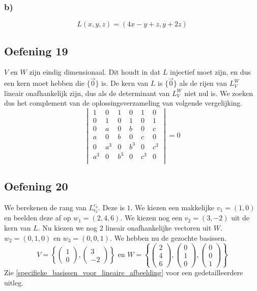 \documentclass[lineaire_algebra_oplossingen.tex]{subfiles}
\begin{document}
\subsubsection*{b)}
\[
L(x,y,z) = (4x-y+z,y+2z)
\]

\subsection{Oefening 19}
$V$ en $W$ zijn eindig dimensionaal. Dit houdt in dat $L$ injectief moet zijn, en dus een kern moet hebben die $\{\vec{0}\}$ is. De kern van $L$ is $\{\vec{0}\}$ als de rijen van $L_V^W$ lineair onafhankelijk zijn, dus als de determinant van $L_V^W$ niet nul is. We zoeken dus het complement van de oplossingsverzameling van volgende vergelijking.
\[
\begin{vmatrix}
1 & 0 & 1 & 0 & 1 & 0\\
0 & 1 & 0 & 1 & 0 & 1\\
0 & a & 0 & b & 0 & c\\
a & 0 & b & 0 & c & 0\\
0 & a^3 & 0 & b^3 & 0 & c^3\\
a^3 & 0 & b^3 & 0 & c^3 & 0\\
\end{vmatrix}
= 0
\]

\subsection{Oefening 20}
We berekenen de rang van $L_{\epsilon_2}^{\epsilon_3}$. Deze is $1$.
We kiezen een makkelijke $v_1 = (1,0)$ en beelden deze af op $w_1 = (2,4,6)$. We kiezen nog een $v_2 = (3,-2)$ uit de kern van $L$. Nu kiezen we nog 2 lineair onafhankelijke vectoren uit $W$. $w_2 = (0,1,0)$ en $w_3 = (0,0,1)$. We hebben nu de gezochte basissen.
\[
V =
\left\{
\begin{pmatrix}
1\\0
\end{pmatrix}
,
\begin{pmatrix}
3\\-2
\end{pmatrix}
\right\}
\text{ en }
W =
\left\{
\begin{pmatrix}
2\\4\\6
\end{pmatrix}
,
\begin{pmatrix}
0\\1\\0
\end{pmatrix}
,
\begin{pmatrix}
0\\0\\1
\end{pmatrix}
\right\}
\]
Zie \ref{specifieke_basissen_voor_lineaire_afbeelding} voor een gedetailleerdere uitleg.
\end{document}
